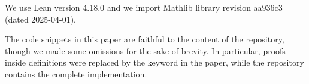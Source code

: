 We use Lean version 4.18.0 and we import Mathlib library revision aa936c3 (dated 2025-04-01).

\begin{comment}
This paper contains many code snippets.
We tried to make them faithful with respect to the content of the repository.
However, sometimes we made omissions for brevity.
In particular, whenever a definition contains a proof, the proof is replaced
by the keyword \texttt{sorry} in the paper, but the repository contains a proof.
\end{comment}

The code snippets in this paper are faithful to the content of the repository, though we made some omissions for the sake of brevity. In particular, proofs inside definitions were replaced by the  keyword in the paper, while the repository contains the complete implementation.


